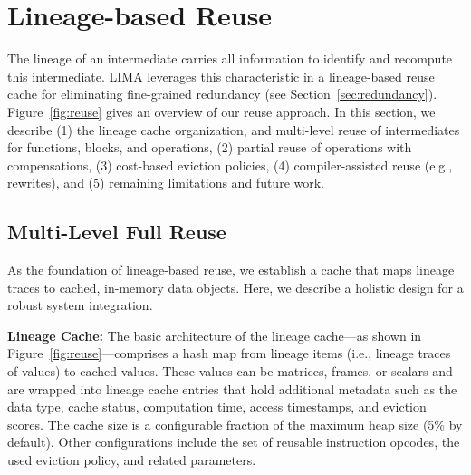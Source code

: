 \section{Lineage-based Reuse}
\label{sec:reuse}

The lineage of an intermediate carries all information to identify and recompute this intermediate. LIMA leverages this characteristic in a lineage-based reuse cache for eliminating fine-grained redundancy (see Section~\ref{sec:redundancy}). Figure~\ref{fig:reuse} gives an overview of our reuse approach. In this section, we describe (1) the lineage cache organization, and multi-level reuse of intermediates for functions, blocks, and operations, (2) partial reuse of operations with compensations, (3) cost-based eviction policies, (4) compiler-assisted reuse (e.g., rewrites), and (5) remaining limitations and future work.

\subsection{Multi-Level Full Reuse}
\label{subsec:mlreuse}

As the foundation of lineage-based reuse, we establish a cache that maps lineage traces to cached, in-memory data objects. Here, we describe a holistic design for a robust system integration.

\textbf{Lineage Cache:} The basic architecture of the lineage cache---as shown in Figure~\ref{fig:reuse}---comprises a hash map from lineage items (i.e., lineage traces of values) to cached values. These values can be matrices, frames, or scalars and are wrapped into lineage cache entries that hold additional metadata such as the data type, cache status, computation time, access timestamps, and eviction scores. The cache size is a configurable fraction of the maximum heap size (5\% by default). Other configurations include the set of reusable instruction opcodes, the used eviction policy, and related parameters.

